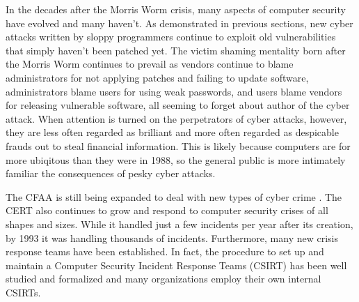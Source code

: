 In the decades after the Morris Worm crisis, many aspects of computer security
have evolved and many haven't. As demonstrated in previous sections, new cyber
attacks written by sloppy programmers continue to exploit old
vulnerabilities that simply haven't been patched yet. The victim shaming
mentality born after the Morris Worm continues to prevail as vendors continue
to blame administrators for not applying patches and failing to update
software, administrators blame users for using weak passwords, and users blame
vendors for releasing vulnerable software, all seeming to forget about
author of the cyber attack. When attention is turned on the perpetrators of
cyber attacks, however, they are less often regarded as brilliant and more often
regarded as despicable frauds out to steal financial information. This is likely
because computers are for more ubiqitous than they were in 1988, so the general
public is more intimately familiar the consequences of pesky cyber attacks.

The CFAA is still being expanded to deal with new types of cyber crime
\cite{adams_controlling_1996}. The CERT also continues to grow and respond to
computer security crises of all shapes and sizes. While it handled just a few
incidents per year after its creation, by 1993 it was handling thousands of
incidents\cite{fithen_cert_1994}. Furthermore, many new crisis response teams
have been established. In fact, the procedure to set up and maintain a Computer
Security Incident Response Teams (CSIRT) has been well studied and formalized
and many organizations employ their own internal CSIRTs. 
